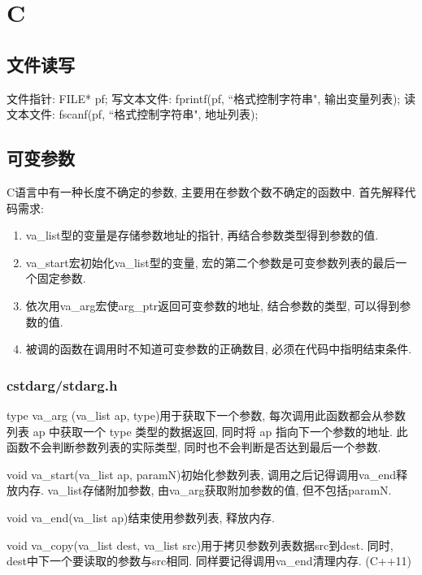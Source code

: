 \chapter{C}
\section{文件读写}
文件指针: FILE* pf; 写文本文件: fprintf(pf, ``格式控制字符串", 输出变量列表);
读文本文件: fscanf(pf, ``格式控制字符串", 地址列表);

\section{可变参数}
C语言中有一种长度不确定的参数, 主要用在参数个数不确定的函数中. 首先解释代码需求:

\begin{enumerate}[(1)]
\item va\_list型的变量是存储参数地址的指针, 再结合参数类型得到参数的值.
\item va\_start宏初始化va\_list型的变量, 宏的第二个参数是可变参数列表的最后一个固定参数.
\item 依次用va\_arg宏使arg\_ptr返回可变参数的地址, 结合参数的类型, 可以得到参数的值.
\item 被调的函数在调用时不知道可变参数的正确数目, 必须在代码中指明结束条件.
\end{enumerate}


\subsection{cstdarg/stdarg.h}
type va\_arg (va\_list ap, type)用于获取下一个参数, 每次调用此函数都会从参数列表 ap 中获取一个 type 类型的数据返回, 
同时将 ap 指向下一个参数的地址. 此函数不会判断参数列表的实际类型, 同时也不会判断是否达到最后一个参数.

void va\_start(va\_list ap, paramN)初始化参数列表, 调用之后记得调用va\_end释放内存. va\_list存储附加参数, 
由va\_arg获取附加参数的值, 但不包括paramN.

void va\_end(va\_list ap)结束使用参数列表, 释放内存.

void va\_copy(va\_list dest, va\_list src)用于拷贝参数列表数据src到dest. 同时,
dest中下一个要读取的参数与src相同. 同样要记得调用va\_end清理内存. (C++11)

